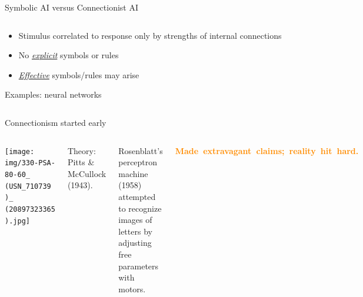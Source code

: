 \documentclass[aspectratio=169]{beamer}
\begin{document}
\begin{frame}{Symbolic AI versus Connectionist AI}
\begin{columns}[t]
\begin{center}
\normalsize
\vspace{0.25 cm}
\begin{itemize}
\item Stimulus correlated to response only by strengths of internal connections
\item No \underline{\it explicit} symbols or rules
\item \underline{\it Effective} symbols/rules may arise
\end{itemize}

Examples: neural networks
\end{center}

\end{columns}
\end{frame}

\begin{frame}{Connectionism started early}
\small
\vspace{0.2 cm}
\begin{columns}
\texttt{[image: img/330-PSA-80-60\_\\(USN\_710739\\)\_\\(20897323365\\).jpg]}

\vspace{0.2 cm}
Theory: Pitts \& McCullock (1943).

\vspace{0.2 cm}
Rosenblatt's perceptron machine (1958) attempted to recognize images of letters by adjusting free parameters with motors.

\vspace{0.2 cm}
\mbox{\textcolor{darkorange}{\bf Made extravagant claims; reality hit hard.}\hspace{-1 cm}}

\includegraphics[width=\linewidth]{img/Organization_of_a_biological_brain_and_a_perceptron.png}
\end{columns}
\end{frame}
\end{document}
